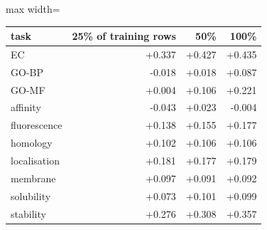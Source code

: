 \begin{adjustbox}{max width=\linewidth}
\begin{tabular}{lrrr}
\toprule
\rowcolor{CompassLavender!32}
task & 25\% of training rows & 50\% & 100\% \\
\midrule
EC & +0.337 & +0.427 & +0.435 \\
GO-BP & -0.018 & +0.018 & +0.087 \\
GO-MF & +0.004 & +0.106 & +0.221 \\
affinity & -0.043 & +0.023 & -0.004 \\
fluorescence & +0.138 & +0.155 & +0.177 \\
homology & +0.102 & +0.106 & +0.106 \\
localisation & +0.181 & +0.177 & +0.179 \\
membrane & +0.097 & +0.091 & +0.092 \\
solubility & +0.073 & +0.101 & +0.099 \\
stability & +0.276 & +0.308 & +0.357 \\
\bottomrule
\end{tabular}
\end{adjustbox}
